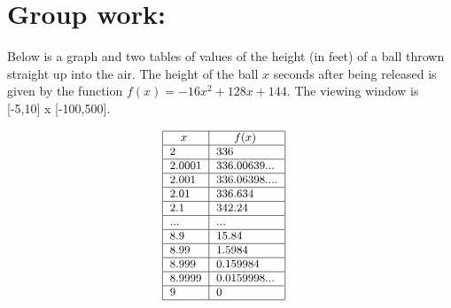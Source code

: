 \documentclass[handout,nooutcomes]{ximera}
\begin{document}
\section*{Group work:}
\begin{problem}
Below is a graph and two tables of values of the height (in feet) of a ball thrown straight up into the air.   The height of the ball $x$ seconds after being released is given by the function $f(x)=-16x^2+128x+144$.  The viewing window is [-5,10] x [-100,500].
	
	
	
	
\[ \begin{array}{lr}

\small{	
\begin{tabular}{|l|l|}
\hline
\hspace{2mm} $x$ & \hspace{4mm} $f(x)$  \\
\hline
2 & 336  \\
\hline
2.0001 & 336.00639...  \\
\hline
2.001 & 336.06398....  \\
\hline
2.01 & 336.634  \\
\hline
2.1 & 342.24  \\
\hline
... & ...  \\
\hline
8.9 & 15.84  \\
\hline
8.99 & 1.5984  \\
\hline
8.999 & 0.159984  \\
\hline
8.9999 & 0.0159998...  \\
\hline
9 & 0 \\
\hline
\end{tabular}
}

&  


\end{array}\]
\end{problem}
\end{document}
